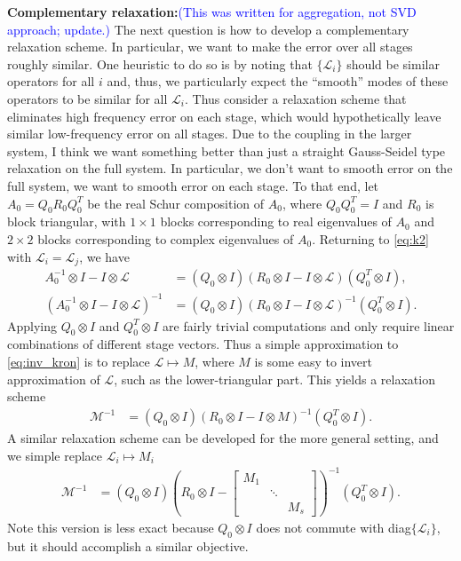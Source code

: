 \documentclass[a4paper,10pt]{article}
\newcommand{\tcb}{\textcolor{blue}}
\begin{document}
\textbf{Complementary relaxation:}\tcb{(This was written for aggregation,
not SVD approach; update.)}
The next question is how to develop a complementary relaxation scheme. In
particular, we want to make the error over all stages roughly similar. One
heuristic to do so is by noting that $\{\mathcal{L}_i\}$ should be similar operators
for all $i$ and, thus, we particularly expect the ``smooth'' modes of these
operators to be similar for all $\mathcal{L}_i$. Thus consider a relaxation
scheme that eliminates high frequency error on each stage, which would
hypothetically leave similar low-frequency error on all stages. Due to 
the coupling in the larger system, I think we want something better than
just a straight Gauss-Seidel type relaxation on the full system. In
particular, we don't want to smooth error on the full system, we want
to smooth error on each stage. To that end, let $A_0 = Q_0R_0Q_0^T$
be the real Schur composition of $A_0$, where $Q_0Q_0^T = I$ and $R_0$
is block triangular, with $1\times 1$ blocks corresponding to real
eigenvalues of $A_0$ and $2\times 2$ blocks corresponding to complex
eigenvalues of $A_0$. Returning to \eqref{eq:k2} with $\mathcal{L}_i =
\mathcal{L}_j$, we have
%
\begin{align}\nonumber
A_0^{-1}\otimes I - I\otimes \mathcal{L}
	& = (Q_0\otimes I) \left( R_0\otimes I -I\otimes \mathcal{L}\right)(Q_0^T\otimes I), \\
\left( A_0^{-1}\otimes I -I\otimes \mathcal{L}\right)^{-1}
	& = (Q_0\otimes I) \left( R_0\otimes I - I\otimes \mathcal{L}\right)^{-1}(Q_0^T\otimes I).
	\label{eq:inv_kron}
\end{align}
%
Applying $Q_0\otimes I$ and $Q_0^T\otimes I$ are fairly trivial computations
and only require linear combinations of different stage vectors. Thus a
simple approximation to \eqref{eq:inv_kron} is to replace $\mathcal{L} \mapsto
M$, where $M$ is some easy to invert approximation of $\mathcal{L}$, such as
the lower-triangular part. This yields a relaxation scheme
%
\begin{align}\label{eq:relax1}
\mathcal{M}^{-1} & = (Q_0\otimes I) \left( R_0\otimes I - 
	I\otimes {M}\right)^{-1}(Q_0^T\otimes I).
\end{align}
%
A similar relaxation scheme can be developed for the more general setting, and
we simple replace $\mathcal{L}_i\mapsto M_i$
%
\begin{align}\label{eq:relax2}
\mathcal{M}^{-1} & = (Q_0\otimes I) \left( R_0\otimes I - 
	\begin{bmatrix} M_1 \\ & \ddots \\ && M_s\end{bmatrix} \right)^{-1}(Q_0^T\otimes I).
\end{align}
%
Note this version is less exact because $Q_0\otimes I$ does not commute with
diag$\{\mathcal{L}_i\}$, but it should accomplish a similar objective.
\end{document}
